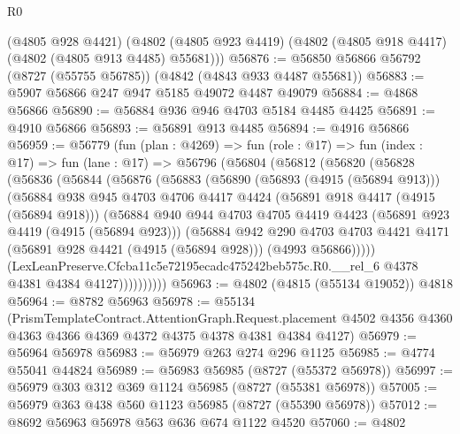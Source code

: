 \begin{lexlean}{R0}
\begin{coremodule}
    (@4805 @928 @4421)
    (@4802 (@4805 @923 @4419) (@4802 (@4805 @918 @4417) (@4802 (@4805 @913 @4485) @55681)))
@56876 := @56850 @56866 @56792 (@8727 (@55755 @56785)) (@4842 (@4843 @933 @4487 @55681))
@56883 := @5907 @56866 @247 @947 @5185 @49072 @4487 @49079
@56884 := @4868 @56866
@56890 := @56884 @936 @946 @4703 @5184 @4485 @4425
@56891 := @4910 @56866
@56893 := @56891 @913 @4485
@56894 := @4916 @56866
@56959 := @56779
    (fun (plan : @4269) =>
    fun (role : @17) =>
    fun (index : @17) =>
    fun (lane : @17) =>
    @56796
      (@56804
        (@56812
          (@56820
            (@56828
              (@56836
                (@56844
                  (@56876
                    (@56883
                      (@56890
                        (@56893 (@4915 (@56894 @913)))
                        (@56884
                          @938
                          @945
                          @4703
                          @4706
                          @4417
                          @4424
                          (@56891 @918 @4417 (@4915 (@56894 @918)))
                          (@56884
                            @940
                            @944
                            @4703
                            @4705
                            @4419
                            @4423
                            (@56891 @923 @4419 (@4915 (@56894 @923)))
                            (@56884
                              @942
                              @290
                              @4703
                              @4703
                              @4421
                              @4171
                              (@56891 @928 @4421 (@4915 (@56894 @928)))
                              (@4993 @56866)))))
                      (LexLeanPreserve.Cfcba11c5e72195ecadc475242beb575c.R0.__rel_6
                        @4378
                        @4381
                        @4384
                        @4127))))))))))
@56963 := @4802 (@4815 (@55134 @19052)) @4818
@56964 := @8782 @56963
@56978 := @55134
    (PrismTemplateContract.AttentionGraph.Request.placement
      @4502
      @4356
      @4360
      @4363
      @4366
      @4369
      @4372
      @4375
      @4378
      @4381
      @4384
      @4127)
@56979 := @56964 @56978
@56983 := @56979 @263 @274 @296 @1125
@56985 := @4774 @55041 @44824
@56989 := @56983 @56985 (@8727 (@55372 @56978))
@56997 := @56979 @303 @312 @369 @1124 @56985 (@8727 (@55381 @56978))
@57005 := @56979 @363 @438 @560 @1123 @56985 (@8727 (@55390 @56978))
@57012 := @8692 @56963 @56978 @563 @636 @674 @1122 @4520
@57060 := @4802

\end{coremodule}
\end{lexlean}
